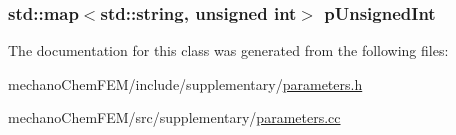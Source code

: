 \subsubsection[{p\-Unsigned\-Int}]{\setlength{\rightskip}{0pt plus 5cm}std\-::map$<$std\-::string, unsigned int$>$ p\-Unsigned\-Int\hspace{0.3cm}{\ttfamily [private]}}\label{classparameters_class_a997bcb31fee3242f776c7e05d709ce12}


The documentation for this class was generated from the following files\-:\begin{DoxyCompactItemize}
\item 
mechano\-Chem\-F\-E\-M/include/supplementary/\hyperlink{parameters_8h}{parameters.\-h}\item 
mechano\-Chem\-F\-E\-M/src/supplementary/\hyperlink{parameters_8cc}{parameters.\-cc}\end{DoxyCompactItemize}
